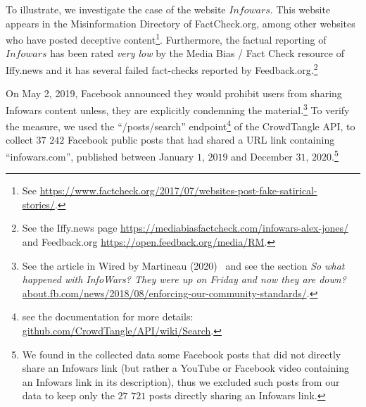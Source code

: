 \documentclass{article}
\begin{document}
\smallskip

To illustrate, we investigate the case of the website $Infowars$. This website appears in the Misinformation Directory of FactCheck.org, among other websites who have posted deceptive content\footnote{See \href{https://www.factcheck.org/2017/07/websites-post-fake-satirical-stories/}{https://www.factcheck.org/2017/07/websites-post-fake-satirical-stories/}.}. Furthermore, the factual reporting of $Infowars$ has been rated {\it very low} by the Media Bias / Fact Check resource of Iffy.news and it has several failed fact-checks reported by Feedback.org.\footnote{See the Iffy.news page \href{https://mediabiasfactcheck.com/infowars-alex-jones/}{https://mediabiasfactcheck.com/infowars-alex-jones/} and Feedback.org \href{https://open.feedback.org/media/RM}{https://open.feedback.org/media/RM}.} 

On May 2, 2019, Facebook announced they would prohibit users from sharing Infowars content unless, they are explicitly condemning the material.\footnote{See the article in Wired by Martineau (2020)~\cite{wiredalexjones} and see the section {\it So what happened with InfoWars? They were up on Friday and now they are down?} \href{https://about.fb.com/news/2018/08/enforcing-our-community-standards/}{about.fb.com/news/2018/08/enforcing-our-community-standards/}.} To verify the measure, we used the ``/posts/search'' endpoint\footnote{see the documentation for more details: \href{https://github.com/CrowdTangle/API/wiki/Search}{github.com/CrowdTangle/API/wiki/Search}.} of the CrowdTangle API, to collect $37$ $242$ Facebook public posts that had shared a URL link containing ``infowars.com'', published between January $1$, $2019$ and December $31$, $2020$.\footnote{We found in the collected data some Facebook posts that did not directly share an Infowars link (but rather a YouTube or Facebook video containing an Infowars link in its description), thus we excluded such posts from our data to keep only the $27$ $721$ posts directly sharing an Infowars link.} 
\end{document}
